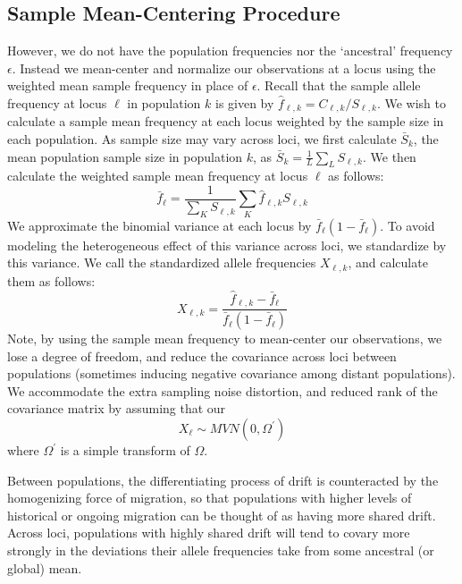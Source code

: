 \documentclass[12pt]{article}
\begin{document}
\subsection*{Sample Mean-Centering Procedure}
However, we do not have the population frequencies nor the `ancestral' frequency $\epsilon$. Instead we mean-center and normalize our observations at a locus using the weighted mean sample frequency in place of $\epsilon$.  Recall that the sample allele frequency at locus $\ell$ in population $k$ is given by $\hat{f}_{\ell,k} = C_{\ell,k}/S_{\ell,k}$.  We wish to calculate a sample mean frequency at each locus weighted by the sample size in each population.  As sample size may vary across loci, we first calculate $\bar{S}_k$, the mean population sample size in population $k$, as $\bar{S}_k = \frac{1}{L}\sum_L S_{\ell,k}$.  We then calculate the weighted sample mean frequency at locus $\ell$ as follows:
\begin{equation}
\label{eq:sample_mean_freq}
\bar{f}_{\ell} = \frac{1}{\sum_K S_{\ell,k}} \sum_K \hat{f}_{\ell,k} S_{\ell,k}
\end{equation}
We approximate the binomial variance at each locus by $\bar{f}_{\ell}(1-\bar{f}_{\ell})$.  To avoid modeling the heterogeneous effect of this variance across loci, we standardize by this variance.  We call the standardized allele frequencies $X_{\ell,k}$, and calculate them as follows:
\begin{equation}
\label{eq:MCN_freqs}
X_{\ell,k} = \frac{ \hat{f}_{\ell,k} - \bar{f}_{\ell} } {\bar{f}_{\ell}(1-\bar{f}_{\ell})}
\end{equation}
Note, by using the sample mean frequency to mean-center our observations, we lose a degree of freedom, and reduce the covariance across loci between populations (sometimes inducing negative covariance among distant populations). We accommodate the extra sampling noise distortion, and reduced rank of the covariance matrix by assuming that our
\begin{equation}
X_{\ell} \sim MVN(0, \Omega^{\prime} )
\end{equation}
where $\Omega^{\prime}$ is a simple transform of $\Omega$.

Between populations, the differentiating process of drift is counteracted by the homogenizing force of migration, so that populations with higher levels of historical or ongoing migration can be thought of as having more shared drift.  Across loci, populations with highly shared drift will tend to covary more strongly in the deviations their allele frequencies take from some ancestral (or global) mean.
\end{document}
